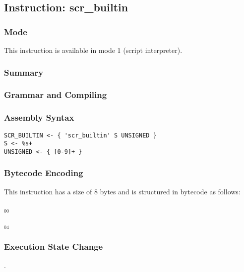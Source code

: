 \subsection{Instruction: scr\_builtin}

\subsubsection{Mode}
This instruction is available in mode 1 (script interpreter).
\subsubsection{Summary}


\subsubsection{Grammar and Compiling}


\subsubsection{Assembly Syntax}

\begin{myquote}
\begin{verbatim}
SCR_BUILTIN <- { 'scr_builtin' S UNSIGNED }
S <- %s+
UNSIGNED <- { [0-9]+ }
\end{verbatim}
\end{myquote}

\subsubsection{Bytecode Encoding}

This instruction has a size of 8 bytes and is structured in bytecode as follows:

$_{00}$\ 



$_{04}$\ 

\subsubsection{Execution State Change}

.


